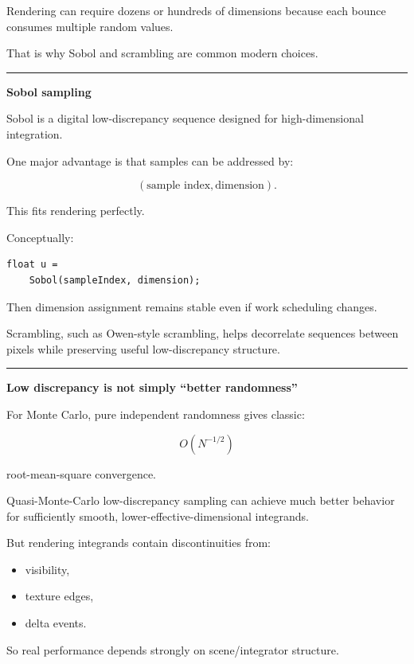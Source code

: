 Rendering can require dozens or hundreds of dimensions because each bounce consumes multiple random values.

That is why Sobol and scrambling are common modern choices.

\begin{center}\rule{0.5\linewidth}{0.5pt}\end{center}

\textbf{Sobol sampling}

Sobol is a digital low-discrepancy sequence designed for high-dimensional integration.

One major advantage is that samples can be addressed by:

\[
(\text{sample index},\text{dimension}).
\]

This fits rendering perfectly.

Conceptually:

\begin{verbatim}
float u =
    Sobol(sampleIndex, dimension);
\end{verbatim}

Then dimension assignment remains stable even if work scheduling changes.

Scrambling, such as Owen-style scrambling, helps decorrelate sequences between pixels while preserving useful low-discrepancy structure.

\begin{center}\rule{0.5\linewidth}{0.5pt}\end{center}

\textbf{Low discrepancy is not simply ``better randomness''}

For Monte Carlo, pure independent randomness gives classic:

\[
O(N^{-1/2})
\]

root-mean-square convergence.

Quasi-Monte-Carlo low-discrepancy sampling can achieve much better behavior for sufficiently smooth, lower-effective-dimensional integrands.

But rendering integrands contain discontinuities from:

\begin{itemize}
\tightlist
\item
  visibility,
\item
  texture edges,
\item
  delta events.
\end{itemize}

So real performance depends strongly on scene/integrator structure.

